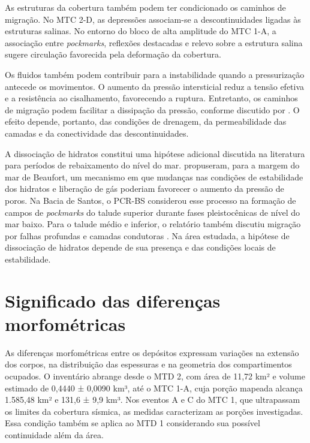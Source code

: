 As estruturas da cobertura também podem ter condicionado os caminhos de migração. No MTC 2-D, as depressões associam-se a descontinuidades ligadas às estruturas salinas. No entorno do bloco de alta amplitude do MTC 1-A, a associação entre \textit{pockmarks}, reflexões destacadas e relevo sobre a estrutura salina sugere circulação favorecida pela deformação da cobertura.

Os fluidos também podem contribuir para a instabilidade quando a pressurização antecede os movimentos. O aumento da pressão intersticial reduz a tensão efetiva e a resistência ao cisalhamento, favorecendo a ruptura. Entretanto, os caminhos de migração podem facilitar a dissipação da pressão, conforme discutido por . O efeito depende, portanto, das condições de drenagem, da permeabilidade das camadas e da conectividade das descontinuidades.

A dissociação de hidratos constitui uma hipótese adicional discutida na literatura para períodos de rebaixamento do nível do mar.  propuseram, para a margem do mar de Beaufort, um mecanismo em que mudanças nas condições de estabilidade dos hidratos e liberação de gás poderiam favorecer o aumento da pressão de poros. Na Bacia de Santos, o PCR-BS considerou esse processo na formação de campos de \textit{pockmarks} do talude superior durante fases pleistocênicas de nível do mar baixo. Para o talude médio e inferior, o relatório também discutiu migração por falhas profundas e camadas condutoras \cite{petrobras2022}. Na área estudada, a hipótese de dissociação de hidratos depende de sua presença e das condições locais de estabilidade.

\section{Significado das diferenças morfométricas}\label{sec:6-5}

As diferenças morfométricas entre os depósitos expressam variações na extensão dos corpos, na distribuição das espessuras e na geometria dos compartimentos ocupados. O inventário abrange desde o MTD 2, com área de 11,72 km² e volume estimado de 0,4440 ± 0,0090 km³, até o MTC 1-A, cuja porção mapeada alcança 1.585,48 km² e 131,6 ± 9,9 km³. Nos eventos A e C do MTC 1, que ultrapassam os limites da cobertura sísmica, as medidas caracterizam as porções investigadas. Essa condição também se aplica ao MTD 1 considerando sua possível continuidade além da área.

